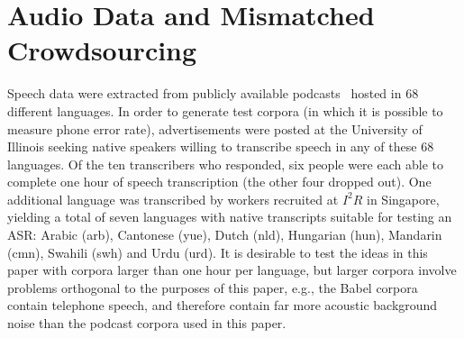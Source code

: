 \section{Audio Data and Mismatched Crowdsourcing}
\label{sec:data}

Speech data were extracted from publicly available podcasts~\cite{SBS}
hosted in 68 different languages.  In order to generate test corpora
(in which it is possible to measure phone error rate), advertisements
were posted at the University of Illinois seeking native speakers
willing to transcribe speech in any of these 68 languages.  Of the ten
transcribers who responded, six people were each able to complete one
hour of speech transcription (the other four dropped out).  One
additional language was transcribed by workers recruited at $I^2R$ in
Singapore, yielding a total of seven languages with native
transcripts suitable for testing an ASR: Arabic (arb), Cantonese
(yue), Dutch (nld), Hungarian (hun), Mandarin (cmn), Swahili (swh) and
Urdu (urd).
It is desirable to test the ideas in this paper with corpora larger
than one hour per language, but larger corpora involve problems
orthogonal to the purposes of this paper, e.g., the Babel corpora
contain telephone speech, and therefore contain far more acoustic
background noise than the podcast corpora used in this paper.

